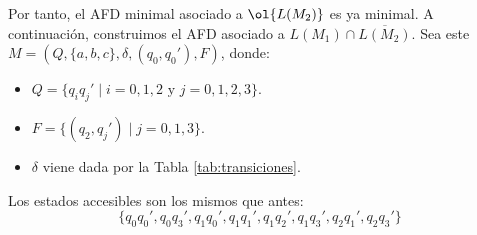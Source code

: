 \begin{ejercicio}
\begin{itemize}
        Por tanto, el AFD minimal asociado a $\ol{L(M_2)}$ es ya minimal. A continuación, construimos el AFD asociado a $L(M_1)\cap \overline{L(M_2)}$. Sea este $M=(Q,\{a,b,c\},\delta,(q_0,q_0'),F)$, donde:
        \begin{itemize}
            \item $Q=\{q_iq_j'\mid i=0,1,2\text{ y }j=0,1,2,3\}$.
            \item $F=\{(q_2,q_j')\mid j=0,1,3\}$.
            \item $\delta$ viene dada por la Tabla \ref{tab:transiciones}.
        \end{itemize}

        Los estados accesibles son los mismos que antes:
        \begin{equation*}
            \{q_0q_0',q_0q_3',q_1q_0',q_1q_1',q_1q_2',q_1q_3',q_2q_1',q_2q_3'\}
        \end{equation*}


\end{itemize}
\end{ejercicio}
